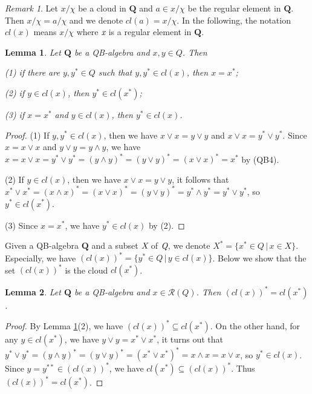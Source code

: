 \documentclass[12pt]{amsart}
\newtheorem{lemma}{Lemma}[section]
\theoremstyle{definition}
\theoremstyle{remark}
\newtheorem{remark}{Remark}[section]
\numberwithin{equation}{section}
\begin{document}
\begin{remark}
Let $x/\chi$ be a cloud in $\mathbf{Q}$ and $a\in x/\chi$ be the regular element in $\mathbf{Q}$. Then $x/\chi=a/\chi$ and we denote $cl(a)=x/\chi$. In the following, the notation  $cl(x)$ means $x/\chi$ where $\emph{x}$ is a regular element in $\mathbf{Q}$.
\end{remark}


\begin{lemma}\label{Lemma number}
Let $\mathbf{Q}$ be a QB-algebra and $x,y\in Q$. Then

\emph{(1)} if there are $y,y^{\ast}\in Q$ such that $y,y^{\ast} \in cl(x)$, then $x=x^{\ast}$;

\emph{(2)} if $y\in cl(x)$, then $y^{\ast}\in cl(x^{\ast})$;

\emph{(3)} if $x=x^{\ast}$ and $y\in cl(x)$, then $y^{\ast}\in cl(x)$.
\end{lemma}

\begin{proof}
(1) If $y,y^{\ast} \in cl(x)$, then we have $x\vee x=y\vee y$ and $x\vee x=y^{\ast} \vee y^{\ast}$. Since $x=x\vee x$ and $y\vee y=y\wedge y$, we have $x=x\vee x=y^{\ast}\vee y^{\ast}=(y\wedge y)^{\ast}=(y\vee y)^{\ast}=(x\vee x)^{\ast}=x^{\ast}$ by (QB4).

(2) If $y\in cl(x)$, then we have $x\vee x=y\vee y$, it follows that $x^{\ast}\vee x^{\ast}=(x\wedge x)^{\ast}=(x\vee x)^{\ast}=(y\vee y)^{\ast}=y^{\ast} \wedge y^{\ast}=y^{\ast} \vee y^{\ast}$, so $y^{\ast}\in cl(x^{\ast})$.

(3) Since $x=x^{\ast}$, we have $y^{\ast}\in cl(x)$ by (2).
\end{proof}

Given a QB-algebra $\mathbf{Q}$ and a subset $\emph{X}$ of $\emph{Q}$, we denote $X^{\ast}=\{x^{\ast}\in Q\,|\,x\in X\}$. Especially, we have $(cl(x))^{\ast}=\{y^{\ast}\in Q\,|\,y\in cl(x)\}$. Below we show that the set $(cl(x))^{\ast}$ is the cloud $cl(x^{\ast})$.

\begin{lemma}\label{clx}
Let $\mathbf{Q}$ be a QB-algebra and $x\in \mathscr{R}(Q)$. Then $(cl(x))^{\ast}=cl(x^{\ast})$.
\end{lemma}

\begin{proof}
By Lemma \ref{Lemma number}(2), we have $(cl(x))^{\ast}\subseteq cl(x^{\ast})$. On the other hand, for any $y\in cl(x^{\ast})$, we have $y\vee y=x^{\ast} \vee x^{\ast}$, it turns out that $y^{\ast}\vee y^{\ast}=(y\wedge y)^{\ast}=(y\vee y)^{\ast}=(x^{\ast}\vee x^{\ast})^{\ast}=x\wedge x=x\vee x$, so $y^{\ast}\in cl(x)$. Since $y=y^{\ast\ast}\in (cl(x))^{\ast}$, we have  $cl(x^{\ast})\subseteq (cl(x))^{\ast}$. Thus $(cl(x))^{\ast}=cl(x^{\ast})$.
\end{proof}
\end{document}
